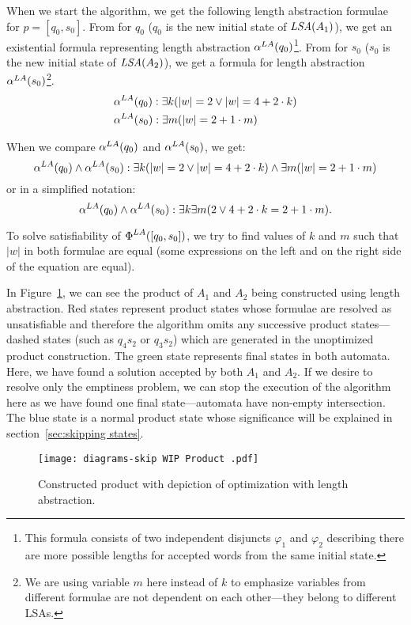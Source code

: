 When we start the algorithm, we get the following length abstraction formulae for $p = [q_0, s_0]$. From  for $q_0$ ($q_0$ is the new initial state of $\emph{LSA}(A_1)$), we get an existential formula representing length abstraction $\alpha^{LA}(q_0)$\footnote{This formula consists of two independent disjuncts $\varphi_1$ and $\varphi_2$ describing there are more possible lengths for accepted words from the same initial state.}. From  for $s_0$ ($s_0$ is the new initial state of $\emph{LSA}(A_2)$), we get a formula for length abstraction $\alpha^{LA}(s_0)$\footnote{We are using variable $m$ here instead of $k$ to emphasize variables from different formulae are not dependent on each other---they belong to different LSAs.}.
\begin{align*}
    &\alpha^{LA}(q_0): \exists k ( |w| = 2 \lor |w| = 4 + 2 \cdot k ) \\
    &\alpha^{LA}(s_0): \exists m ( |w| = 2 + 1 \cdot m )
\end{align*}

When we compare $\alpha^{LA}(q_0)$ and $\alpha^{LA}(s_0)$, we get:
\[
    \alpha^{LA}(q_0) \land \alpha^{LA}(s_0) : \exists k ( |w| = 2 \lor |w| = 4 + 2 \cdot k ) \land \exists m ( |w| = 2 + 1 \cdot m )
\]
or in a simplified notation:
$$ \alpha^{LA}(q_0) \land \alpha^{LA}(s_0) : \exists k \exists m ( 2 \lor 4 + 2 \cdot k = 2 + 1 \cdot m ) \text{.} $$

To solve satisfiability of $\emph{$\Phi$}^{LA}([q_0, s_0])$, we try to find values of $k$ and $m$ such that $|w|$ in both formulae are equal (some expressions on the left and on the right side of the equation are equal).

In Figure~\ref{fig:product_WIP}, we can see the product of $A_1$ and $A_2$ being constructed using length abstraction. Red states represent product states whose formulae are resolved as unsatisfiable and therefore the algorithm omits any successive product states---dashed states (such as $q_4s_2$ or $q_3s_2$) which are generated in the unoptimized product construction. The green state represents final states in both automata. Here, we have found a solution accepted by both $A_1$ and $A_2$. If we desire to resolve only the emptiness problem, we can stop the execution of the algorithm here as we have found one final state---automata have non-empty intersection. The blue state is a normal product state whose significance will be explained in section~\ref{sec:skipping states}.

\begin{figure}[ht]
	\centering
	\texttt{[image: diagrams-skip WIP Product .pdf]}
	\caption{Constructed product with depiction of optimization with length abstraction.}
	\label{fig:product_WIP}
\end{figure}

